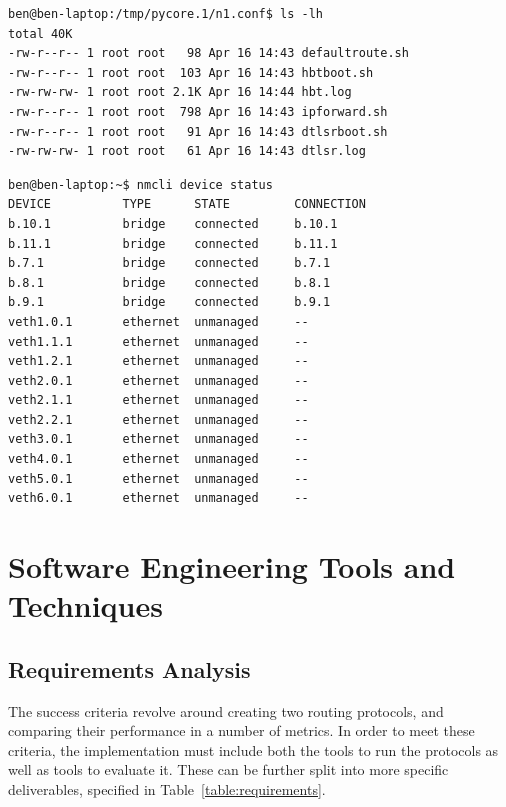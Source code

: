 \documentclass[withindex,glossary,openany]{cam-thesis}
\begin{document}
\begin{minipage}{1\textwidth} \centering
\begin{lstlisting}[label=core_filesystem, frame=tb, caption=Example of a virtualised file-system]
ben@ben-laptop:/tmp/pycore.1/n1.conf$ ls -lh
total 40K
-rw-r--r-- 1 root root   98 Apr 16 14:43 defaultroute.sh
-rw-r--r-- 1 root root  103 Apr 16 14:43 hbtboot.sh
-rw-rw-rw- 1 root root 2.1K Apr 16 14:44 hbt.log
-rw-r--r-- 1 root root  798 Apr 16 14:43 ipforward.sh
-rw-r--r-- 1 root root   91 Apr 16 14:43 dtlsrboot.sh
-rw-rw-rw- 1 root root   61 Apr 16 14:43 dtlsr.log
\end{lstlisting}
\end{minipage}

\begin{minipage}{1\textwidth} \centering
\begin{lstlisting}[label=core_interfaces, frame=tb, caption=Virtualised network interfaces and bridges]
ben@ben-laptop:~$ nmcli device status
DEVICE          TYPE      STATE         CONNECTION
b.10.1          bridge    connected     b.10.1
b.11.1          bridge    connected     b.11.1
b.7.1           bridge    connected     b.7.1
b.8.1           bridge    connected     b.8.1
b.9.1           bridge    connected     b.9.1
veth1.0.1       ethernet  unmanaged     --
veth1.1.1       ethernet  unmanaged     --
veth1.2.1       ethernet  unmanaged     --
veth2.0.1       ethernet  unmanaged     --
veth2.1.1       ethernet  unmanaged     --
veth2.2.1       ethernet  unmanaged     --
veth3.0.1       ethernet  unmanaged     --
veth4.0.1       ethernet  unmanaged     --
veth5.0.1       ethernet  unmanaged     --
veth6.0.1       ethernet  unmanaged     --
\end{lstlisting}
\end{minipage}

\pagebreak

\section{Software Engineering Tools and Techniques}

\subsection{Requirements Analysis}

The success criteria revolve around creating two routing protocols, and comparing their performance in a number of metrics. In order to meet these criteria, the implementation must include both the tools to run the protocols as well as tools to evaluate it. These can be further split into more specific deliverables,
specified in Table~\ref{table:requirements}.
\end{document}

